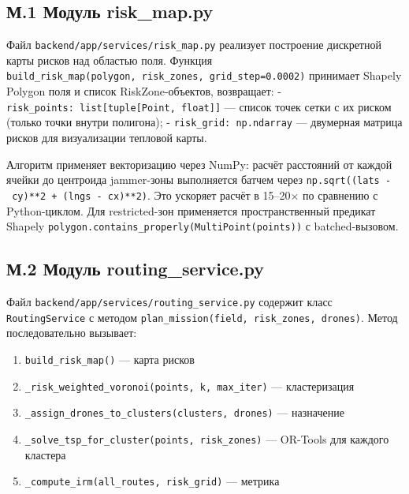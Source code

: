 \documentclass[14pt,a4paper]{extarticle}
\providecommand{\tightlist}{%
  \setlength{\itemsep}{0pt}\setlength{\parskip}{0pt}}
\begin{document}
\hypertarget{ux43c.1-ux43cux43eux434ux443ux43bux44c-risk_map.py}{%
\subsection{М.1 Модуль risk\_map.py}\label{ux43c.1-ux43cux43eux434ux443ux43bux44c-risk_map.py}}

Файл \texttt{backend/app/services/risk\_map.py} реализует построение дискретной карты рисков над областью поля. Функция \texttt{build\_risk\_map(polygon,\ risk\_zones,\ grid\_step=0.0002)} принимает Shapely Polygon поля и список RiskZone-объектов, возвращает: - \texttt{risk\_points:\ list{[}tuple{[}Point,\ float{]}{]}} --- список точек сетки с их риском (только точки внутри полигона); - \texttt{risk\_grid:\ np.ndarray} --- двумерная матрица рисков для визуализации тепловой карты.

Алгоритм применяет векторизацию через NumPy: расчёт расстояний от каждой ячейки до центроида jammer-зоны выполняется батчем через \texttt{np.sqrt((lats\ -\ cy)**2\ +\ (lngs\ -\ cx)**2)}. Это ускоряет расчёт в 15--20× по сравнению с Python-циклом. Для restricted-зон применяется пространственный предикат Shapely \texttt{polygon.contains\_properly(MultiPoint(points))} с batched-вызовом.

\hypertarget{ux43c.2-ux43cux43eux434ux443ux43bux44c-routing_service.py}{%
\subsection{М.2 Модуль routing\_service.py}\label{ux43c.2-ux43cux43eux434ux443ux43bux44c-routing_service.py}}

Файл \texttt{backend/app/services/routing\_service.py} содержит класс \texttt{RoutingService} с методом \texttt{plan\_mission(field,\ risk\_zones,\ drones)}. Метод последовательно вызывает:

\begin{enumerate}
\def\labelenumi{\arabic{enumi}.}
\tightlist
\item
  \texttt{build\_risk\_map()} --- карта рисков
\item
  \texttt{\_risk\_weighted\_voronoi(points,\ k,\ max\_iter)} --- кластеризация
\item
  \texttt{\_assign\_drones\_to\_clusters(clusters,\ drones)} --- назначение
\item
  \texttt{\_solve\_tsp\_for\_cluster(points,\ risk\_zones)} --- OR-Tools для каждого кластера
\item
  \texttt{\_compute\_irm(all\_routes,\ risk\_grid)} --- метрика
\end{enumerate}
\end{document}

